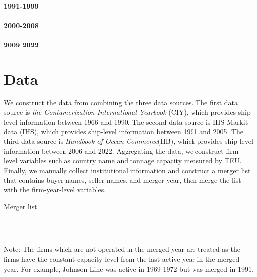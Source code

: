 \documentclass[10pt]{article}
\begin{document}
\cite{matsuda2022unified}

\paragraph{1991-1999}

\paragraph{2000-2008}

\paragraph{2009-2022}

\section{Data}

We construct the data from combining the three data sources. 
The first data source is \textit{the Containerization International Yearbook} (CIY), which provides ship-level information between 1966 and 1990.
The second data source is IHS Markit data (IHS), which provides ship-level information between 1991 and 2005.
The third data source is \textit{Handbook of Ocean Commerce}(HB), which provides ship-level information between 2006 and 2022. 
Aggregating the data, we construct firm-level variables such as country name and tonnage capacity measured by TEU. 
Finally, we manually collect institutional information and construct a merger list that contains buyer names, seller names, and merger year, then merge the list with the firm-year-level variables.



\begin{table}[!htbp]
  \begin{center}
      \caption{Merger list}
      \label{tb:merger_list_CIY} 
      \subfloat[CIY (1966-1990)]{}\\
      \subfloat[IHS (1991-2005)]{}\\
      \subfloat[HB (2005-2022)]{}
  \end{center}\footnotesize
  Note: The firms which are not operated in the merged year are treated as the firms have the constant capacity level from the last active year in the merged year. For example, Johnson Line was active in 1969-1972 but was merged in 1991.
\end{table} 
\end{document}
